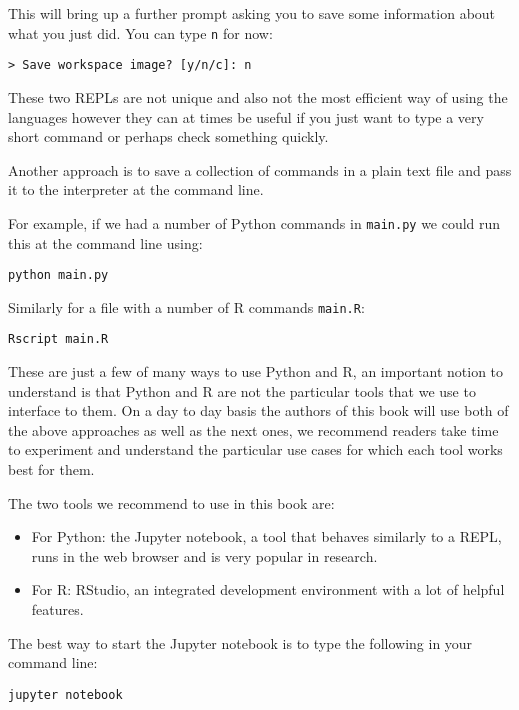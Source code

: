 This will bring up a further prompt asking you to save some information about
what you just did. You can type \texttt{n} for now:

\begin{verbatim}
> Save workspace image? [y/n/c]: n
\end{verbatim}

These two REPLs are not unique and also not the most efficient way of using the
languages however they can at times be useful if you just want to type a very
short command or perhaps check something quickly.

Another approach is to save a collection of commands in a plain text file and
pass it to the interpreter at the command line.

For example, if we had a number of Python commands in \texttt{main.py}
we could run this at the command line using:

\begin{verbatim}
python main.py
\end{verbatim}

Similarly for a file with a number of R commands \texttt{main.R}:

\begin{verbatim}
Rscript main.R
\end{verbatim}

These are just a few of many ways to use Python and R, an important notion to
understand is that Python and R are not the particular tools that we use to
interface to them. On a day to day basis the authors of this book will use both
of the above approaches as well as the next ones, we recommend readers take time
to experiment and understand the particular use cases for which each tool works
best for them.

The two tools we recommend to use in this book are:

\begin{itemize}
    \item For Python: the Jupyter notebook, a tool that behaves similarly to a
        REPL, runs in the web browser and is very popular in research.
    \item For R: RStudio, an integrated development environment with a lot of
        helpful features.
\end{itemize}

The best way to start the Jupyter notebook is to type the following in your
command line:

\begin{verbatim}
jupyter notebook
\end{verbatim}

